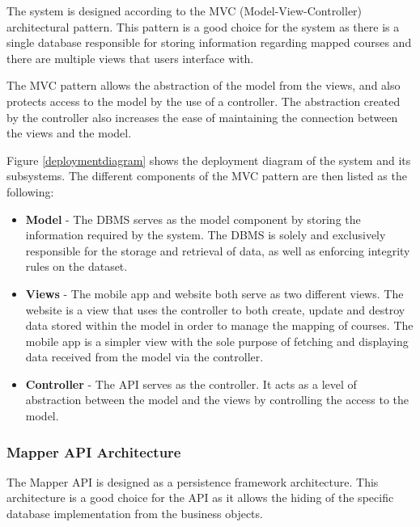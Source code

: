 \documentclass{article}
\begin{document}
    The system is designed according to the MVC (Model-View-Controller)
    architectural pattern. This pattern is a good choice for the system as
    there is a single database responsible for storing information regarding
    mapped courses and there are multiple views that users interface with.
    
    The MVC pattern allows the abstraction of the model from the views, and
    also protects access to the model by the use of a controller. The
    abstraction created by the controller also increases the ease of
    maintaining the connection between the views and the model.

    Figure \ref{deploymentdiagram} shows the deployment diagram of the system
    and its subsystems. The different components of the MVC pattern are then
    listed as the following:

    \begin{itemize}
        \item \textbf{Model} - The DBMS serves as the model component by
            storing the information required by the system. The DBMS is solely
            and exclusively responsible for the storage and retrieval of data,
            as well as enforcing integrity rules on the dataset.
        \item \textbf{Views} - The mobile app and website both serve as two
            different views. The website is a view that uses the controller to
            both create, update and destroy data stored within the model in
            order to manage the mapping of courses. The mobile app is a simpler
            view with the sole purpose of fetching and displaying data received
            from the model via the controller.
        \item \textbf{Controller} - The API serves as the controller. It acts
            as a level of abstraction between the model and the views by
            controlling the access to the model.
    \end{itemize}

    \subsubsection{Mapper API Architecture}

    The Mapper API is designed as a persistence framework architecture. This
    architecture is a good choice for the API as it allows the hiding of the
    specific database implementation from the business objects.
\end{document}
